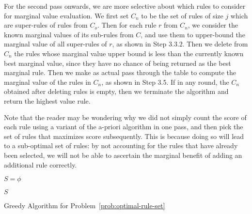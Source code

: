 For the second pass onwards, we are more selective about which rules to consider for marginal value evaluation. We first set $C_n$ to be the set of rules of size $j$ which are super-rules of rules from $C_o$. Then for each rule $r$ from $C_n$, we consider the known marginal values of its sub-rules from $C$, and use them to upper-bound the marginal value of all super-rules of $r$, as shown in Step 3.3.2. Then we delete from $C_n$ the rules whose marginal value upper bound is less than the currently known best marginal value, since they have no chance of being returned as the best marginal rule. Then we make as actual pass through the table to compute the marginal value of the rules in $C_n$, as shown in Step 3.5. If in any round, the $C_n$ obtained after deleting rules is empty, then we terminate the algorithm and return the highest value rule. 

Note that the reader may be wondering why we did not simply count the score of each rule using a variant of the a-priori algorithm in one pass, and then pick the set of rules that maximizes score subsequently. This is because doing so will lead to a sub-optimal set of rules: by not accounting for the rules that have already been selected, we will not be able to ascertain the marginal benefit of adding an additional rule correctly.

\begin{algorithm}\label{algo:best-rule-set}
$S = \phi$ 

\Return $S$
\caption{Greedy Algorithm for Problem~\ref{prob:optimal-rule-set}}
\end{algorithm}


